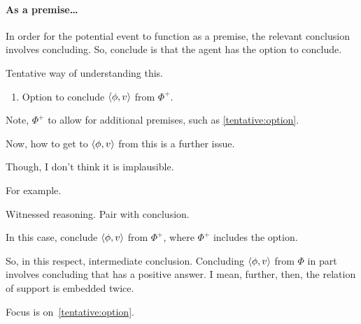 \paragraph{As a premise\dots}

\begin{note}
  In order for the potential event to function as a premise, the relevant conclusion involves concluding.
  So, conclude is that the agent has the option to conclude.

  Tentative way of understanding this.
  \begin{enumerate}
  \item
    \label{tentative:option}
    Option to conclude \(\langle \phi, v \rangle\) from \(\Phi^{+}\).
  \end{enumerate}
  Note, \(\Phi^{+}\) to allow for additional premises, such as \ref{tentative:option}.
\end{note}

\begin{note}
  Now, how to get to \(\langle \phi, v \rangle\) from this is a further issue.

  Though, I don't think it is implausible.

  For example.

  Witnessed reasoning.
  Pair with conclusion.

  In this case, conclude \(\langle \phi, v \rangle\) from \(\Phi^{+}\), where \(\Phi^{+}\) includes the option.

  So, in this respect, intermediate conclusion.
  Concluding \(\langle \phi, v \rangle\) from \(\Phi\) in part involves concluding that \qzS{} has a positive answer.
  I mean, further, then, the relation of support is embedded twice.
\end{note}

\begin{note}
  Focus is on~\ref{tentative:option}.
\end{note}

